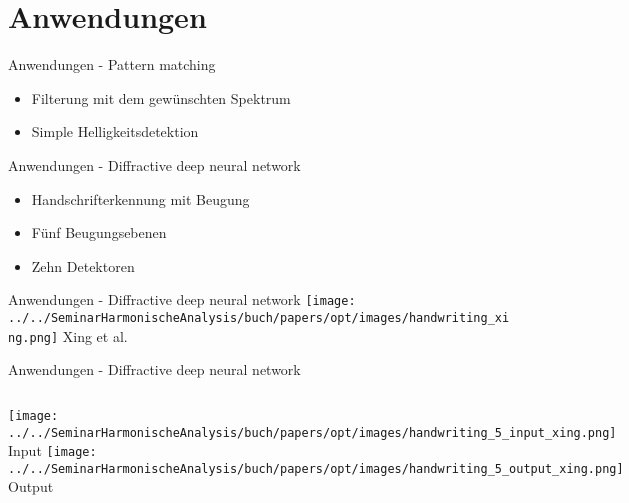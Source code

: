 \section{Anwendungen}

\begin{frame}{Anwendungen - Pattern matching}
    \begin{itemize}
        \item Filterung mit dem gewünschten Spektrum
        \item Simple Helligkeitsdetektion
    \end{itemize}
\end{frame}

\begin{frame}{Anwendungen - Diffractive deep neural network}
    \begin{itemize}
        \item Handschrifterkennung mit Beugung
        \item Fünf Beugungsebenen
        \item Zehn Detektoren
    \end{itemize}
\end{frame}

\begin{frame}{Anwendungen - Diffractive deep neural network}
    \centering
    \texttt{[image: ../../SeminarHarmonischeAnalysis/buch/papers/opt/images/handwriting\_xing.png]}
    Xing et al. \cite{opt:Lin.2018}
\end{frame}

\begin{frame}{Anwendungen - Diffractive deep neural network}
    \begin{columns}
        \texttt{[image: ../../SeminarHarmonischeAnalysis/buch/papers/opt/images/handwriting\_5\_input\_xing.png]}
        Input
        \texttt{[image: ../../SeminarHarmonischeAnalysis/buch/papers/opt/images/handwriting\_5\_output\_xing.png]}
        Output
    \end{columns}
\end{frame}
